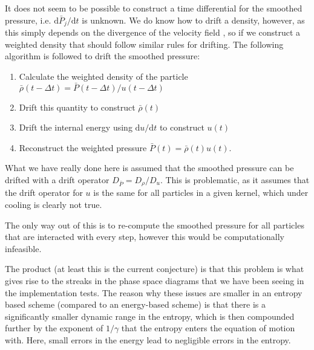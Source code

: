 It does not seem to be possible to construct a time differential for the smoothed
pressure, i.e. $\mathrm{d} \bar{P}_j / \mathrm{d} t$ is unknown. We do know
how to drift a density, however, as this simply depends on the divergence of the
velocity field \citep[see ][]{Price2012}, so if we construct a weighted density
that should follow similar rules for drifting. The following algorithm is followed
to drift the smoothed pressure:
\begin{enumerate}
    \item Calculate the weighted density of the particle
          $\bar{\rho}(t - \Delta t) = \bar{P}(t - \Delta t) / u (t - \Delta t)$
    \item Drift this quantity to construct $\bar{\rho}(t)$
    \item Drift the internal energy using $\mathrm{d} u / \mathrm{d} t$ to
          construct $u(t)$
    \item Reconstruct the weighted pressure $\bar{P}(t) = \bar{\rho}(t) u(t)$.
\end{enumerate}
What we have really done here is assumed that the smoothed pressure can
be drifted with a drift operator $D_{\bar{P}} = D_{\rho} / D_{u}$. This is
problematic, as it assumes that the drift operator for $u$ is the same for
all particles in a given kernel, which under cooling is clearly not true.

The only way out of this is to re-compute the smoothed pressure for all particles
that are interacted with every step, however this would be computationally
infeasible.

The product (at least this is the current conjecture) is that this problem is
what gives rise to the streaks in the phase space diagrams that we have been
seeing in the \swift{} \eagle{} implementation tests. The reason why these
issues are smaller in an entropy based scheme (compared to an energy-based
scheme) is that there is a significantly smaller dynamic range in the
entropy, which is then compounded further by the exponent of $1/\gamma$ that
the entropy enters the equation of motion with. Here, small errors in the
energy lead to negligible errors in the entropy.